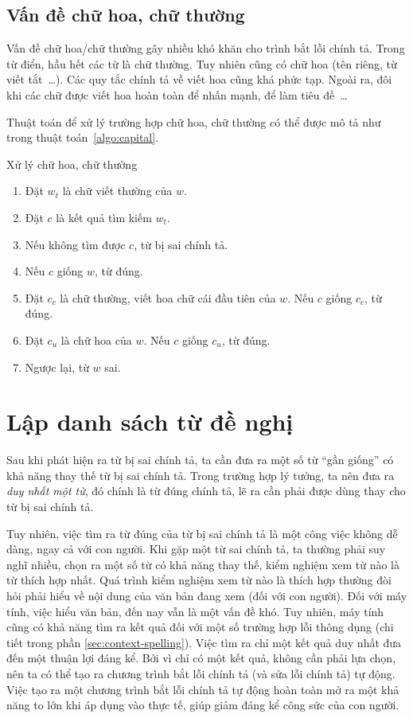 \documentclass[a4paper,oneside,14pt]{extbook} %
\begin{document}
\subsection{Vấn đề chữ hoa, chữ thường}

Vấn đề chữ hoa/chữ thường gây nhiều khó khăn cho trình bắt lỗi chính
tả. Trong từ điển, hầu hết các từ là chữ thường. Tuy nhiên cũng có chữ
hoa (tên riêng, từ viết tắt~\ldots{}). Các quy tắc chính tả về viết hoa
cũng khá phức tạp. Ngoài ra, đôi khi các chữ được viết hoa hoàn toàn
để nhấn mạnh, để làm tiêu đề~\ldots{}

Thuật toán để xử lý trường hợp chữ hoa, chữ thường có thể được mô tả
như trong thuật toán~\ref{algo:capital}.
\begin{algo}
\caption{Xử lý chữ hoa, chữ thường}
\label{algo:capital}
\begin{enumerate}
\item Đặt $w_t$ là chữ viết thường của $w$.
\item Đặt $c$ là kết quả tìm kiếm $w_t$.
\item Nếu không tìm được $c$, từ bị sai chính tả.
\item Nếu $c$ giống $w$, từ đúng.
\item Đặt $c_c$ là chữ thường, viết hoa chữ cái đầu tiên của $w$. Nếu
  $c$ giống $c_c$, từ đúng.
\item Đặt $c_u$ là chữ hoa của $w$. Nếu $c$ giống $c_u$, từ đúng.
\item Ngược lại, từ $w$ sai.
\end{enumerate}
\end{algo}



\section{Lập danh sách từ đề nghị}
\label{sec:candidate-list}

Sau khi phát hiện ra từ bị sai chính tả, ta cần đưa ra một số từ ``gần
giống'' có khả năng thay thế từ bị sai chính tả. Trong trường hợp lý
tưởng, ta nên đưa ra {\em duy nhất một từ}, đó chính là từ đúng
chính tả, lẽ ra cần phải được dùng thay cho từ bị sai chính tả.

Tuy nhiên, việc tìm ra từ đúng của từ bị sai chính tả là một công việc
không dễ dàng, ngay cả với con người. Khi gặp một từ sai chính tả, ta
thường phải suy nghĩ nhiều, chọn ra một số từ có khả năng thay thế,
kiểm nghiệm xem từ nào là từ thích hợp nhất. Quá trình kiểm nghiệm xem
từ nào là thích hợp thường đòi hỏi phải hiểu về nội dung của văn bản
đang xem (đối với con người). Đối với máy tính, việc hiểu văn bản, đến
nay vẫn là một vấn đề khó. Tuy nhiên, máy tính cũng có khả năng tìm ra
kết quả đối với một số trường hợp lỗi thông dụng (chi tiết trong phần
\ref{sec:context-spelling}). Việc tìm ra chỉ một kết quả duy nhất đưa
đến một thuận lợi đáng kể. Bởi vì chỉ có một kết quả, không cần phải lựa
chọn, nên ta có thể tạo ra chương trình bắt lỗi chính tả (và sửa lỗi
chính tả) tự động. Việc tạo ra một chương trình bắt lỗi chính tả tự
động hoàn toàn mở ra một khả năng to lớn khi áp dụng vào thực tế, giúp
giảm đáng kể công sức của con người.
\end{document}
